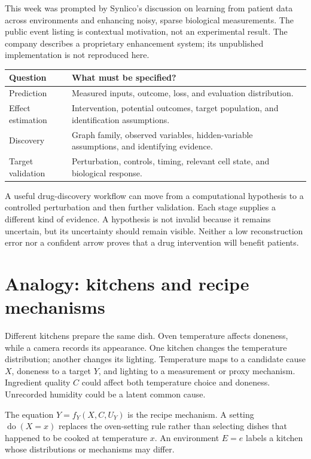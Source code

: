 \documentclass[11pt,oneside]{scrbook}
\begin{document}
This week was prompted by Synlico's discussion on learning from patient data across
environments and enhancing noisy, sparse biological measurements. The public event listing
is contextual motivation, not an experimental result. The company describes a proprietary
enhancement system; its unpublished implementation is not reproduced here.

\begin{center}
\begin{tabular}{p{}p{}}
\toprule
Question & What must be specified?\\
\midrule
Prediction & Measured inputs, outcome, loss, and evaluation distribution.\\
Effect estimation & Intervention, potential outcomes, target population, and identification assumptions.\\
Discovery & Graph family, observed variables, hidden-variable assumptions, and identifying evidence.\\
Target validation & Perturbation, controls, timing, relevant cell state, and biological response.\\
\bottomrule
\end{tabular}
\end{center}

A useful drug-discovery workflow can move from a computational hypothesis to a controlled
perturbation and then further validation. Each stage supplies a different kind of evidence.
A hypothesis is not invalid because it remains uncertain, but its uncertainty should
remain visible. Neither a low reconstruction error nor a confident arrow proves that a
drug intervention will benefit patients.

\section{Analogy: kitchens and recipe mechanisms}
Different kitchens prepare the same dish. Oven temperature affects doneness, while a
camera records its appearance. One kitchen changes the temperature distribution;
another changes its lighting. Temperature maps to a candidate cause $X$, doneness
to a target $Y$, and lighting to a measurement or proxy mechanism. Ingredient quality
$C$ could affect both temperature choice and doneness. Unrecorded humidity could be a
latent common cause.

The equation $Y=f_Y(X,C,U_Y)$ is the recipe mechanism. A setting
\(\operatorname{do}(X=x)\) replaces the oven-setting rule rather than selecting dishes
that happened to be cooked at temperature $x$. An environment $E=e$ labels a kitchen
whose distributions or mechanisms may differ.
\end{document}
